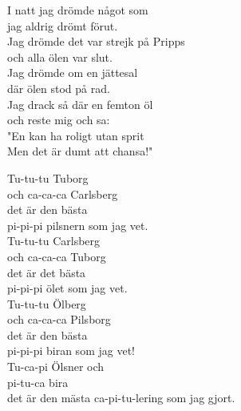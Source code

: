 \documentclass[a6paper, 10pt, twoside]{article}
\begin{document}
\begin{center}
\end{center}
\begin{lyrics}
I natt jag drömde något som\\
jag aldrig drömt förut.\\
Jag drömde det var strejk på Pripps\\
och alla ölen var slut.
\vspace{5pt}\\
Jag drömde om en jättesal\\
där ölen stod på rad.\\
Jag drack så där en femton öl\\
och reste mig och sa:
\vspace{5pt}\\
"En kan ha roligt utan sprit\\
Men det är dumt att chansa!"
\end{lyrics}
\begin{center}
\end{center}
\begin{lyrics}
Tu-tu-tu Tuborg\\
och ca-ca-ca Carlsberg\\
det är den bästa \\
pi-pi-pi pilsnern som jag vet.
\vspace{5pt} \\
Tu-tu-tu Carlsberg\\
och ca-ca-ca Tuborg\\
det är det bästa\\
pi-pi-pi ölet som jag vet.
\vspace{5pt} \\
Tu-tu-tu Ölberg\\
och ca-ca-ca Pilsborg\\
det är den bästa \\
pi-pi-pi biran som jag vet!
\vspace{5pt}\\
Tu-ca-pi Ölsner och \\
pi-tu-ca bira\\
det är den mästa ca-pi-tu-lering som jag gjort.
\end{lyrics}
\end{document}

